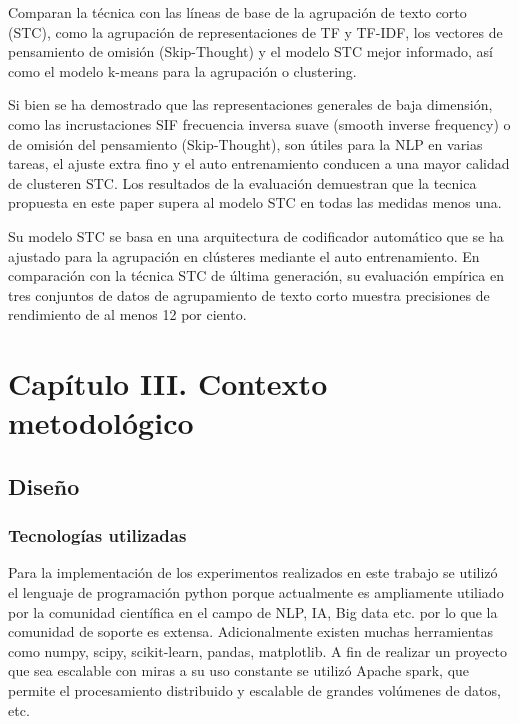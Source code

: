 \documentclass[12pt]{article}
\begin{document}
			
			Comparan la técnica con las líneas de base de la agrupación de texto corto (STC), como la agrupación de representaciones de TF y TF-IDF, los vectores de pensamiento de omisión (Skip-Thought) y el modelo STC mejor informado, así como el modelo k-means para la agrupación o clustering. 
			
			Si bien se ha demostrado que las representaciones generales de baja dimensión, como las incrustaciones SIF frecuencia inversa suave (smooth inverse frequency) o de omisión del pensamiento (Skip-Thought), son útiles para la NLP en varias tareas, el ajuste extra fino y el auto entrenamiento conducen a una mayor calidad de clusteren STC. Los resultados de la evaluación demuestran que la tecnica propuesta en este paper supera al modelo STC en todas las medidas menos una.
			
			Su modelo STC se basa en una arquitectura de codificador automático que se ha ajustado para la agrupación en clústeres mediante el auto entrenamiento. En comparación con la técnica STC de última generación, su evaluación empírica en tres conjuntos de datos de agrupamiento de texto corto muestra precisiones de rendimiento de al menos 12 por ciento.
	
	
	
			
			
			
			
			
			
						
	

		
		
		\newpage
	\section{Capítulo III. Contexto metodológico}
		\subsection{Diseño}	
		
			\subsubsection{Tecnologías utilizadas}
			Para la implementación de los experimentos realizados en este trabajo se utilizó el lenguaje de programación python porque actualmente es ampliamente utiliado por la comunidad científica en el campo de NLP, IA, Big data etc. por lo que la comunidad de soporte es extensa. Adicionalmente existen muchas herramientas como numpy, scipy, scikit-learn, pandas, matplotlib. A fin de realizar un proyecto que sea escalable con miras a su uso constante se utilizó Apache spark, que permite el procesamiento distribuido y escalable de grandes volúmenes de datos, etc.				
		
\end{document}
